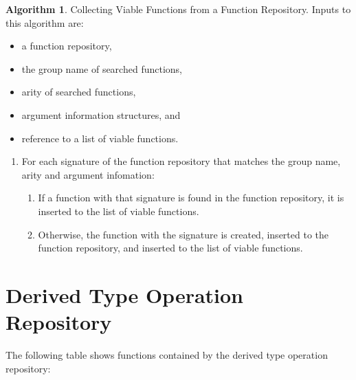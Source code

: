 \documentclass[a4paper,oneside,11pt]{book}
\theoremstyle{definition}
\newtheorem{algo}{Algorithm}[section]
\begin{document}
\begin{algo} Collecting Viable Functions from a Function Repository.
Inputs to this algorithm are:
\begin{itemize}
\item
a function repository,
\item
the group name of searched functions,
\item
arity of searched functions,
\item
argument information structures, and
\item
reference to a list of viable functions.
\end{itemize}
\begin{enumerate}
\item
For each signature of the function repository that matches the group name, arity and argument infomation:
\begin{enumerate}
\item
If a function with that signature is found in the function repository, it is inserted to the list of viable functions.
\item
Otherwise, the function with the signature is created, inserted to the function repository, and inserted to the list of viable functions.
\end{enumerate}
\end{enumerate}
\end{algo}

\section{Derived Type Operation Repository}

The following table shows functions contained by the derived type operation repository:
\end{document}
